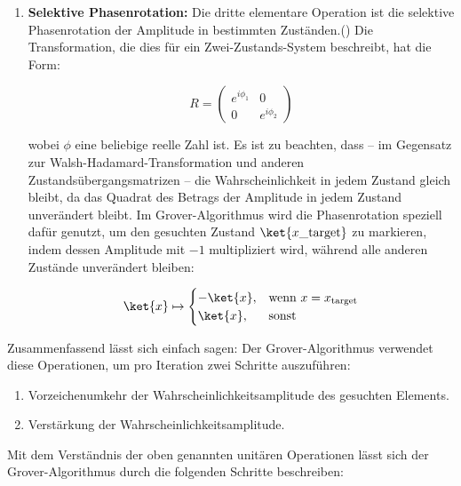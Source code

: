 {\begin{enumerate}
$$
\text{Vorzeichen} = (-1)^{x \cdot y}
$$

Dabei ist $x \cdot y$ das bitweise Skalarprodukt der $n$-Bit-Binärzahlen $x$ und $y$.\\

    \item \textbf{Selektive Phasenrotation:} Die dritte elementare Operation ist die selektive Phasenrotation der Amplitude in bestimmten Zuständen.(\cite{zotero-1211}) Die Transformation, die dies für ein Zwei-Zustands-System beschreibt, hat die Form:

    $$
R = \begin{pmatrix}
e^{i\phi_1} & 0 \\
0 & e^{i\phi_2}
\end{pmatrix}
$$

wobei \( \phi \) eine beliebige reelle Zahl ist. Es ist zu beachten, dass – im Gegensatz zur Walsh-Hadamard-Transformation und anderen Zustandsübergangsmatrizen – die Wahrscheinlichkeit in jedem Zustand gleich bleibt, da das Quadrat des Betrags der Amplitude in jedem Zustand unverändert bleibt.
Im Grover-Algorithmus wird die Phasenrotation speziell dafür genutzt, um den gesuchten Zustand $\ket{x\_{\text{target}}}$ zu markieren, indem dessen Amplitude mit $-1$ multipliziert wird, während alle anderen Zustände unverändert bleiben:

$$
\ket{x} \mapsto 
\begin{cases}
- \ket{x}, & \text{wenn } x = x_{\text{target}} \\
\ket{x}, & \text{sonst}
\end{cases}
$$

\end{enumerate}

Zusammenfassend lässt sich einfach sagen: Der Grover-Algorithmus verwendet diese Operationen, um pro Iteration zwei Schritte auszuführen:
\begin{enumerate}
  \item Vorzeichenumkehr der Wahrscheinlichkeitsamplitude des gesuchten Elements.
  \item Verstärkung der Wahrscheinlichkeitsamplitude.
\end{enumerate}

Mit dem Verständnis der oben genannten unitären Operationen lässt sich der Grover-Algorithmus durch die folgenden Schritte beschreiben:

}
